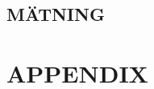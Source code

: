 \documentclass[a4paper,twoside,twocolumn,openright]{book}
\begin{document}
\chapter{MÄTNING}

\cleardoublepage


%
%
%
%


%
%
%
%

%

%
%
%
%
%
%

%
%
%

%

\appendix
\part{APPENDIX}

%

%
%
%
%
%
%
%
%


\listoffigures
\listoftables

\backmatter

\printindex
\end{document}
